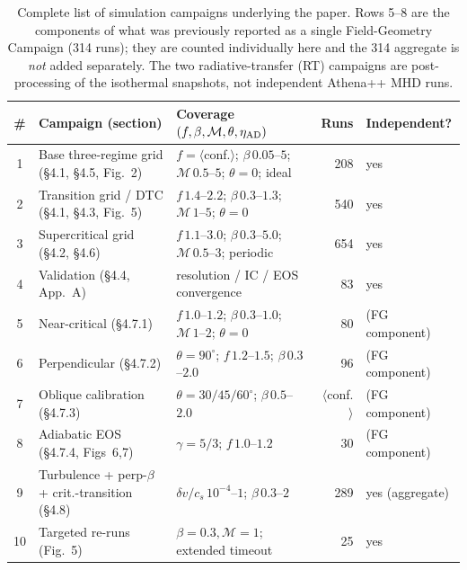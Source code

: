 \begin{table}
\caption{Complete list of simulation campaigns underlying the paper. Rows 5--8 are the
components of what was previously reported as a single Field-Geometry Campaign (314 runs);
they are counted individually here and the 314 aggregate is \emph{not} added separately.
The two radiative-transfer (RT) campaigns are post-processing of the isothermal snapshots,
not independent Athena++ MHD runs.}
\label{tab:campaigns}
\begin{tabular}{cllrl}
\hline
\# & Campaign (section) & Coverage $(f,\beta,\mathcal{M},\theta,\eta_{\rm AD})$ & Runs & Independent? \\
\hline
1  & Base three-regime grid (\S4.1, \S4.5, Fig.~2) & $f=\langle$conf.$\rangle$; $\beta\,0.05$--$5$; $\mathcal{M}\,0.5$--$5$; $\theta=0$; ideal & 208 & yes \\
2  & Transition grid / DTC (\S4.1, \S4.3, Fig.~5)   & $f\,1.4$--$2.2$; $\beta\,0.3$--$1.3$; $\mathcal{M}\,1$--$5$; $\theta=0$ & 540 & yes \\
3  & Supercritical grid (\S4.2, \S4.6)              & $f\,1.1$--$3.0$; $\beta\,0.3$--$5.0$; $\mathcal{M}\,0.5$--$3$; periodic & 654 & yes \\
4  & Validation (\S4.4, App.~A)                     & resolution / IC / EOS convergence & 83 & yes \\
5  & Near-critical (\S4.7.1)                        & $f\,1.0$--$1.2$; $\beta\,0.3$--$1.0$; $\mathcal{M}\,1$--$2$; $\theta=0$ & 80 & (FG component) \\
6  & Perpendicular (\S4.7.2)                        & $\theta=90^\circ$; $f\,1.2$--$1.5$; $\beta\,0.3$--$2.0$ & 96 & (FG component) \\
7  & Oblique calibration (\S4.7.3)                  & $\theta=30/45/60^\circ$; $\beta\,0.5$--$2.0$ & $\langle$conf.$\rangle$ & (FG component) \\
8  & Adiabatic EOS (\S4.7.4, Figs~6,7)             & $\gamma=5/3$; $f\,1.0$--$1.2$ & 30 & (FG component) \\
9  & Turbulence + perp-$\beta$ + crit.-transition (\S4.8) & $\delta v/c_s\,10^{-4}$--$1$; $\beta\,0.3$--$2$ & 289 & yes (aggregate) \\
10 & Targeted re-runs (Fig.~5)                      & $\beta=0.3,\mathcal{M}=1$; extended timeout & 25 & yes \\

\end{tabular}
\end{table}
